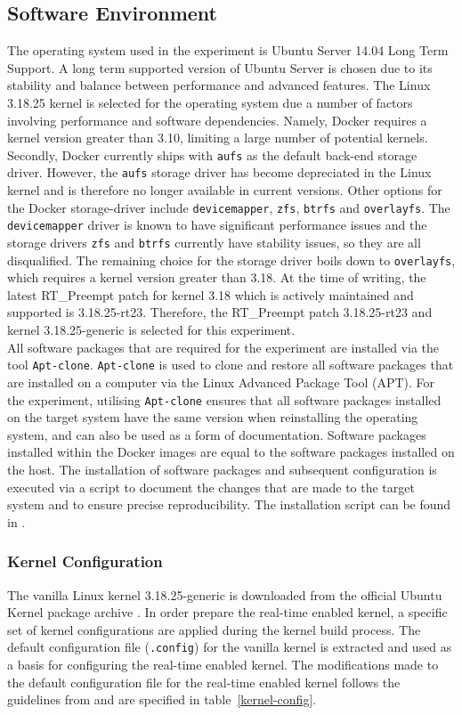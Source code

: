 \subsection{Software Environment} \label{soft-env}
The operating system used in the experiment is Ubuntu Server 14.04 Long Term Support. A long term supported version of Ubuntu Server is chosen due to its stability and balance between performance and advanced features. The Linux 3.18.25 kernel is selected for the operating system due a number of factors involving performance and software dependencies. Namely, Docker requires a kernel version greater than 3.10, limiting a large number of potential kernels. Secondly, Docker currently ships with \texttt{aufs} as the default back-end storage driver. However, the \texttt{aufs} storage driver has become depreciated in the Linux kernel and is therefore no longer available in current versions. Other options for the Docker storage-driver include \texttt{devicemapper}, \texttt{zfs}, \texttt{btrfs} and \texttt{overlayfs}. The \texttt{devicemapper} driver is known to have significant performance issues and the storage drivers \texttt{zfs} and \texttt{btrfs} currently have stability issues, so they are all disqualified. The remaining choice for the storage driver boils down to \texttt{overlayfs}, which requires a kernel version greater than 3.18. At the time of writing, the latest RT\_Preempt patch for kernel 3.18 which is actively maintained and supported is 3.18.25-rt23. Therefore, the RT\_Preempt patch 3.18.25-rt23 and kernel 3.18.25-generic is selected for this experiment. \\

All software packages that are required for the experiment are installed via the tool \texttt{Apt-clone}. \texttt{Apt-clone} is used to clone and restore all software packages that are installed on a computer via the Linux Advanced Package Tool (APT). For the experiment, utilising \texttt{Apt-clone} ensures that all software packages installed on the target system have the same version when reinstalling the operating system, and can also be used as a form of documentation. Software packages installed within the Docker images are equal to the software packages installed on the host. The installation of software packages and subsequent configuration is executed via a script to document the changes that are made to the target system and to ensure precise reproducibility. The installation script can be found in \cite{to-come}. 


\subsubsection{Kernel Configuration} 
The vanilla Linux kernel 3.18.25-generic is downloaded from the official Ubuntu Kernel package archive \cite{kernel}. In order prepare the real-time enabled kernel, a specific set of kernel configurations are applied during the kernel build process. The default configuration file (\texttt{.config}) for the vanilla kernel is extracted and used as a basis for configuring the real-time enabled kernel. The modifications made to the default configuration file for the real-time enabled kernel follows the guidelines from \cite{rt-howto} and are specified in table~\ref{kernel-config}.  

